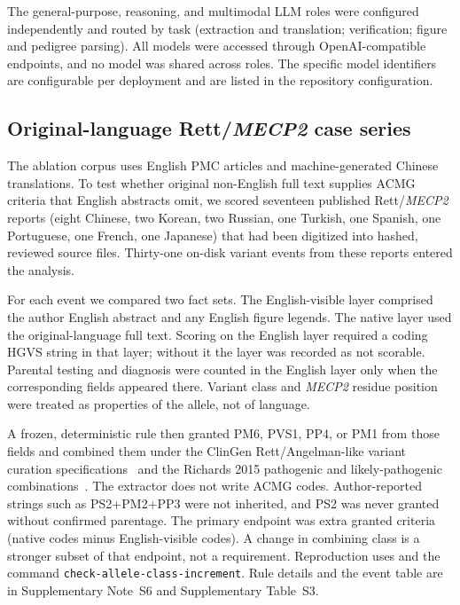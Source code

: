 \documentclass[preprint,12pt]{elsarticle}
\begin{document}
The general-purpose, reasoning, and multimodal LLM roles were configured
independently and routed by task (extraction and translation;
verification; figure and pedigree parsing). All models were accessed
through OpenAI-compatible endpoints, and no model was shared across
roles. The specific model identifiers are configurable per deployment and
are listed in the repository configuration.

\subsection{Original-language Rett/\textit{MECP2} case series}
\label{sec:case-series}

The ablation corpus uses English PMC articles and machine-generated
Chinese translations. To test whether original non-English full text
supplies ACMG criteria that English abstracts omit, we scored seventeen
published Rett/\textit{MECP2} reports (eight Chinese, two Korean, two
Russian, one Turkish, one Spanish, one Portuguese, one French, one
Japanese) that had been digitized into hashed, reviewed source files.
Thirty-one on-disk variant events from these reports entered the analysis.

For each event we compared two fact sets. The English-visible layer
comprised the author English abstract and any English figure legends. The
native layer used the original-language full text. Scoring on the English
layer required a coding HGVS string in that layer; without it the layer
was recorded as not scorable. Parental testing and diagnosis were counted
in the English layer only when the corresponding fields appeared there.
Variant class and \textit{MECP2} residue position were treated as
properties of the allele, not of language.

A frozen, deterministic rule then granted PM6, PVS1, PP4, or PM1 from
those fields and combined them under the ClinGen Rett/Angelman-like
variant curation specifications~\cite{mcknight2022} and the Richards 2015
pathogenic and likely-pathogenic combinations~\cite{richards2015}. The
extractor does not write ACMG codes. Author-reported strings such as
PS2+PM2+PP3 were not inherited, and PS2 was never granted without
confirmed parentage. The primary endpoint was extra granted criteria
(native codes minus English-visible codes). A change in combining class
is a stronger subset of that endpoint, not a requirement. Reproduction
uses  and the command
\texttt{check-allele-class-increment}. Rule details and the event table
are in Supplementary Note~S6 and Supplementary Table~S3.
\end{document}
